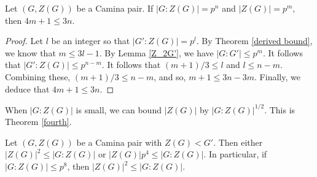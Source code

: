 \begin{corollary}
Let $(G, Z(G))$ be a Camina pair.  If $|G:Z (G)| = p^n$ and $|Z (G)| = p^m$, then $4m + 1 \le 3n$.
\end{corollary}

\begin{proof}
Let $l$ be an integer so that $|G':Z (G)| = p^l$.  By Theorem \ref{derived bound}, we know that $m \le 3l - 1$.  By Lemma \ref{Z_2G'}, we have $|G:G'| \le p^m$.  It follows that $|G':Z (G)| \le p^{n-m}$.  It follows that $(m + 1)/3 \le l$ and $l \le n - m$.  Combining these, $(m+1)/3 \le n - m$, and so, $m + 1 \le 3n - 3m$.  Finally, we deduce that $4m + 1 \le 3n$.
\end{proof}

When $|G:Z (G)|$ is small, we can bound $|Z (G)|$ by $|G:Z (G)|^{1/2}$.  This is Theorem \ref{fourth}.

\begin{theorem}
Let $(G,Z(G))$ be a Camina pair with $Z (G) < G'$.  Then either $|Z (G)|^2 \le |G:Z(G)|$ or $|Z (G)|p^4 \le |G:Z(G)|$.  In particular, if $|G:Z(G)| \le p^8$, then $|Z (G)|^2 \le |G:Z (G)|$.
\end{theorem}

